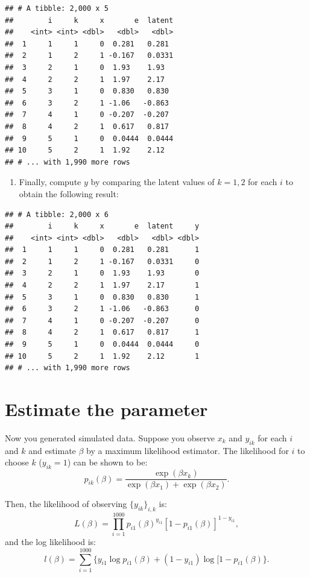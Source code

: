 \documentclass[]{book}
\providecommand{\tightlist}{%
  \setlength{\itemsep}{0pt}\setlength{\parskip}{0pt}}
\begin{document}
\begin{verbatim}
## # A tibble: 2,000 x 5
##        i     k     x       e  latent
##    <int> <int> <dbl>   <dbl>   <dbl>
##  1     1     1     0  0.281   0.281 
##  2     1     2     1 -0.167   0.0331
##  3     2     1     0  1.93    1.93  
##  4     2     2     1  1.97    2.17  
##  5     3     1     0  0.830   0.830 
##  6     3     2     1 -1.06   -0.863 
##  7     4     1     0 -0.207  -0.207 
##  8     4     2     1  0.617   0.817 
##  9     5     1     0  0.0444  0.0444
## 10     5     2     1  1.92    2.12  
## # ... with 1,990 more rows
\end{verbatim}

\begin{enumerate}
\def\labelenumi{\arabic{enumi}.}
\setcounter{enumi}{3}
\tightlist
\item
  Finally, compute \(y\) by comparing the latent values of \(k = 1, 2\)
  for each \(i\) to obtain the following result:
\end{enumerate}

\begin{verbatim}
## # A tibble: 2,000 x 6
##        i     k     x       e  latent     y
##    <int> <int> <dbl>   <dbl>   <dbl> <dbl>
##  1     1     1     0  0.281   0.281      1
##  2     1     2     1 -0.167   0.0331     0
##  3     2     1     0  1.93    1.93       0
##  4     2     2     1  1.97    2.17       1
##  5     3     1     0  0.830   0.830      1
##  6     3     2     1 -1.06   -0.863      0
##  7     4     1     0 -0.207  -0.207      0
##  8     4     2     1  0.617   0.817      1
##  9     5     1     0  0.0444  0.0444     0
## 10     5     2     1  1.92    2.12       1
## # ... with 1,990 more rows
\end{verbatim}

\section{Estimate the parameter}\label{estimate-the-parameter}

Now you generated simulated data. Suppose you observe \(x_k\) and
\(y_{ik}\) for each \(i\) and \(k\) and estimate \(\beta\) by a maximum
likelihood estimator. The likelihood for \(i\) to choose \(k\)
(\(y_{ik} = 1\)) can be shown to be: \[
p_{ik}(\beta) = \frac{\exp(\beta x_k)}{\exp(\beta x_1) + \exp(\beta x_2)}.
\]

Then, the likelihood of observing \(\{y_{ik}\}_{i, k}\) is: \[
L(\beta) = \prod_{i = 1}^{1000} p_{i1}(\beta)^{y_{i1}} [1 - p_{i1}(\beta)]^{1 - y_{i1}},
\] and the log likelihood is: \[
l(\beta) = \sum_{i = 1}^{1000}\{y_{i1}\log p_{i1}(\beta) + (1 - y_{i1})\log [1 - p_{i1}(\beta)\}.
\]
\end{document}
